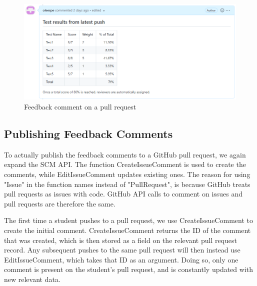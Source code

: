 \begin{figure}[ht]
    \centering
    \includegraphics[width=\textwidth]{photos/feedback-comment.PNG}
    \caption{Feedback comment on a pull request}
    \label{fig:feedback-comment}
\end{figure}

\subsection{Publishing Feedback Comments}

To actually publish the feedback comments to a GitHub pull request, we again expand the SCM API.
The function CreateIssueComment is used to create the comments, while EditIssueComment updates existing ones.
The reason for using "Issue" in the function names instead of "PullRequest", is because GitHub treats pull requests as issues with code.
GitHub API calls to comment on issues and pull requests are therefore the same.

The first time a student pushes to a pull request, we use CreateIssueComment to create the initial comment.
CreateIssueComment returns the ID of the comment that was created, which is then stored as a field on the relevant pull request record.
Any subsequent pushes to the same pull request will then instead use EditIssueComment, which takes that ID as an argument.
Doing so, only one comment is present on the student's pull request, and is constantly updated with new relevant data.